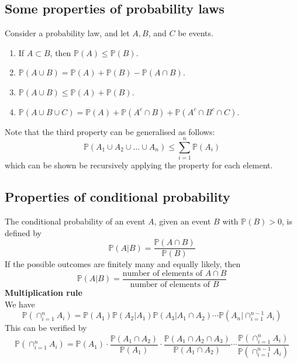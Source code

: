 \documentclass{report}
\begin{document}
\subsection{Some properties of probability laws}
Consider a probability law, and let $A,B$, and $C$ be events.
\begin{enumerate}
\item If $A\subset B$, then $\mathbb P(A)\leq\mathbb P(B)$.
\item $\mathbb P(A\cup B)=\mathbb P(A)+\mathbb P(B)-\mathbb P(A\cap B)$.
\item $\mathbb P(A\cup B)\leq \mathbb P(A)+\mathbb P(B)$.
\item $\mathbb P(A\cup B\cup C)=\mathbb P(A)+\mathbb P(A^c\cap B)+\mathbb P(A^c\cap B^c\cap C)$.
\end{enumerate}
Note that the third property can be generalised as follows:
\begin{equation*}
\mathbb P(A_1\cup A_2\cup\ldots\cup A_n)\leq\sum^n_{i=1}\mathbb P(A_i)
\end{equation*}
which can be shown be recursively applying the property for each element.
\newpage

\subsection{Properties of conditional probability}
The conditional probability of an event $A$, given an event $B$ with $\mathbb P(B)>0$, is defined by
\begin{equation*}
\mathbb P(A|B)=\frac{\mathbb P(A\cap B)}{\mathbb P(B)}
\end{equation*}
If the possible outcomes are finitely many and equally likely, then
\begin{equation*}
\mathbb P(A|B)=\frac{\text{number of elements of }A\cap B}{\text{number of elements of }B}
\end{equation*}
\textbf{Multiplication rule}\\
We have
\begin{equation*}
\mathbb P(\cap^n_{i=1}A_i)=\mathbb P(A_1)\mathbb P(A_2|A_1)\mathbb P(A_3|A_1\cap A_2)\cdots
\mathbb P(A_n|\cap^{n-1}_{i=1}A_i)
\end{equation*}
This can be verified by
\begin{equation*}
\mathbb P(\cap^n_{i=1}A_i)=\mathbb P(A_1)\cdot\frac{\mathbb P(A_1\cap A_2)}{\mathbb P(A_1)}\cdot
\frac{\mathbb P(A_1\cap A_2\cap A_3)}{\mathbb P(A_1\cap A_2)}\cdots
\frac{\mathbb P(\cap^n_{i=1}A_i)}{\mathbb P(\cap^{n-1}_{i=1}A_i)}
\end{equation*}
\end{document}
